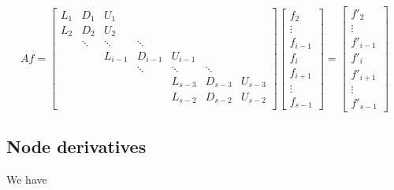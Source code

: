 \documentclass[11pt]{article}
\begin{document}
\[ Af = \left[
\begin{array}{ccccccccc}
L_{1} & D_{1}    & U_{1}     &           &           &           &         \\
L_{2} & D_{2}    & U_{2}     &           &           &           &         \\
      & \ddots   & \ddots    & \ddots    &           &           &         \\
      &          & L_{i-1}   & D_{i-1}   & U_{i-1}   &           &         \\
      &          &           & \ddots    & \ddots    & \ddots    &         \\
      &          &           &           & L_{s-3}   & D_{s-3}   & U_{s-3} \\
      &          &           &           & L_{s-2}   & D_{s-2}   & U_{s-2} \\
\end{array} \right] 
\left[ \begin{array}{c}
f_{2} \\ \vdots \\ f_{i-1} \\ f_{i} \\ f_{i+1} \\ \vdots \\ f_{s-1}
\end{array} \right]
=
\left[ \begin{array}{c}
f'_{2} \\ \vdots \\ f'_{i-1} \\ f'_{i} \\ f'_{i+1} \\ \vdots \\ f'_{s-1}
\end{array} \right]
\]

\subsection{Node derivatives}
We have
\end{document}
